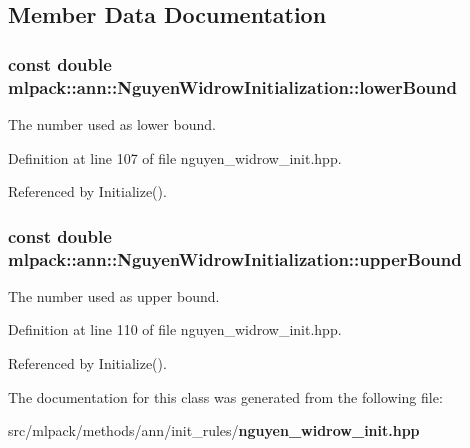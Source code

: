 \subsection{Member Data Documentation}
\subsubsection[{lower\+Bound}]{\setlength{\rightskip}{0pt plus 5cm}const double mlpack\+::ann\+::\+Nguyen\+Widrow\+Initialization\+::lower\+Bound\hspace{0.3cm}{\ttfamily [private]}}\label{classmlpack_1_1ann_1_1NguyenWidrowInitialization_a60ae790db77596a962215c629edaaff5}


The number used as lower bound. 



Definition at line 107 of file nguyen\+\_\+widrow\+\_\+init.\+hpp.



Referenced by Initialize().

\subsubsection[{upper\+Bound}]{\setlength{\rightskip}{0pt plus 5cm}const double mlpack\+::ann\+::\+Nguyen\+Widrow\+Initialization\+::upper\+Bound\hspace{0.3cm}{\ttfamily [private]}}\label{classmlpack_1_1ann_1_1NguyenWidrowInitialization_a87d667d5f25c0a6c7fc495573cbfb242}


The number used as upper bound. 



Definition at line 110 of file nguyen\+\_\+widrow\+\_\+init.\+hpp.



Referenced by Initialize().



The documentation for this class was generated from the following file\+:\begin{DoxyCompactItemize}
\item 
src/mlpack/methods/ann/init\+\_\+rules/{\bf nguyen\+\_\+widrow\+\_\+init.\+hpp}\end{DoxyCompactItemize}
